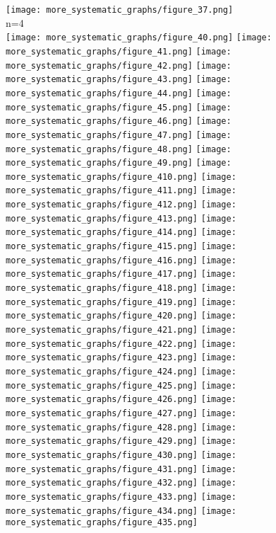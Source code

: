 \documentclass{Assignment}
\begin{document}
\texttt{[image: more\_systematic\_graphs/figure\_37.png]}
\\
n=4\\
\texttt{[image: more\_systematic\_graphs/figure\_40.png]}
\texttt{[image: more\_systematic\_graphs/figure\_41.png]}
\texttt{[image: more\_systematic\_graphs/figure\_42.png]}
\texttt{[image: more\_systematic\_graphs/figure\_43.png]}
\texttt{[image: more\_systematic\_graphs/figure\_44.png]}
\texttt{[image: more\_systematic\_graphs/figure\_45.png]}
\texttt{[image: more\_systematic\_graphs/figure\_46.png]}
\texttt{[image: more\_systematic\_graphs/figure\_47.png]}
\texttt{[image: more\_systematic\_graphs/figure\_48.png]}
\texttt{[image: more\_systematic\_graphs/figure\_49.png]}
\texttt{[image: more\_systematic\_graphs/figure\_410.png]}
\texttt{[image: more\_systematic\_graphs/figure\_411.png]}
\texttt{[image: more\_systematic\_graphs/figure\_412.png]}
\texttt{[image: more\_systematic\_graphs/figure\_413.png]}
\texttt{[image: more\_systematic\_graphs/figure\_414.png]}
\texttt{[image: more\_systematic\_graphs/figure\_415.png]}
\texttt{[image: more\_systematic\_graphs/figure\_416.png]}
\texttt{[image: more\_systematic\_graphs/figure\_417.png]}
\texttt{[image: more\_systematic\_graphs/figure\_418.png]}
\texttt{[image: more\_systematic\_graphs/figure\_419.png]}
\texttt{[image: more\_systematic\_graphs/figure\_420.png]}
\texttt{[image: more\_systematic\_graphs/figure\_421.png]}
\texttt{[image: more\_systematic\_graphs/figure\_422.png]}
\texttt{[image: more\_systematic\_graphs/figure\_423.png]}
\texttt{[image: more\_systematic\_graphs/figure\_424.png]}
\texttt{[image: more\_systematic\_graphs/figure\_425.png]}
\texttt{[image: more\_systematic\_graphs/figure\_426.png]}
\texttt{[image: more\_systematic\_graphs/figure\_427.png]}
\texttt{[image: more\_systematic\_graphs/figure\_428.png]}
\texttt{[image: more\_systematic\_graphs/figure\_429.png]}
\texttt{[image: more\_systematic\_graphs/figure\_430.png]}
\texttt{[image: more\_systematic\_graphs/figure\_431.png]}
\texttt{[image: more\_systematic\_graphs/figure\_432.png]}
\texttt{[image: more\_systematic\_graphs/figure\_433.png]}
\texttt{[image: more\_systematic\_graphs/figure\_434.png]}
\texttt{[image: more\_systematic\_graphs/figure\_435.png]}
\end{document}
